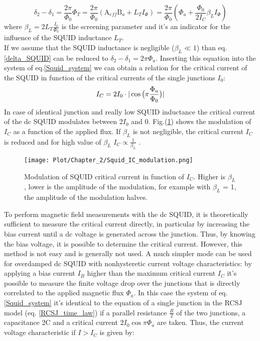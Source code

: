 \documentclass[12pt,a4paper]{report}
\begin{document}
    \begin{equation}
    	\delta_2-\delta_1= \frac{2\pi}{\Phi_0}\Phi_T=\frac{2\pi}{\Phi_0}(\text{A}_{eff}\text{B}_a + L_T I_{\Phi}) = \frac{2\pi}{\Phi_0} ( \Phi_a + \frac{\Phi_0}{2 I_C}\beta_LI_{\Phi})
    	\label{delta_SQUID}
    \end{equation}
    where $\beta_L = 2 L_T\frac{I_0}{\Phi_0}$ is the screening parameter and it's an indicator for the influence of the SQUID inductance $L_T$. \\
    If we assume that the SQUID inductance is negligible ($\beta_L \ll 1 $) than eq.\ref{delta_SQUID} can be reduced to $\delta_2 - \delta_1 = 2\pi\Phi_a$. Inserting this equation into the system of eq.\ref{Squid_system} we can obtain a relation for the critical current of the SQUID in function of the critical currents of the single junctions $I_0$:
    \begin{equation}
    	I_C=2I_0\cdot \arrowvert \cos \big( \pi \frac{\Phi_a}{\Phi_0}\big) \arrowvert
    	\label{CH2_eq_critical_current}
    \end{equation}
    In case of identical junction and really low SQUID inductance the critical current of the dc SQUID modulates between 2$I_0$ and 0. Fig.(\ref{SQUID_modulation}) shows the modulation of $I_C$ as a function of the applied flux. If $\beta_L$ is not negligible, the critical current $I_C$ is reduced and for high value of $\beta_L$ $I_C\propto \frac{1}{\beta_L}$ \cite{Squid_handbook_1}.
    \begin{figure} [H]
    	\centering
    	\texttt{[image: Plot/Chapter\_2/Squid\_IC\_modulation.png]}
    	\caption{\small{ Modulation of SQUID critical current in function of $I_C$. Higher is $\beta_L$, lower is the amplitude of the modulation, for example with $\beta_L$ = 1, the amplitude of the modulation halves.}}
    	\label{SQUID_modulation}
    \end{figure}
    To perform magnetic field measurements with the dc SQUID, it is theoretically sufficient to measure the critical current directly, in particular by increasing the bias current until a dc voltage is generated across the junction. Thus, by knowing the bias voltage, it is possible to determine the critical current. However, this method is not easy and is generally not used. A much simpler mode can be used for overdamped dc SQUID with nonhysteretic current voltage characteristics: by applying a bias current $I_B$ higher than the maximum critical current $I_C$ it's possible to measure the finite voltage drop over the junctions that is directly correlated to the applied magnetic flux $\Phi_a$. In this case the system of eq.\ref{Squid_system} it's identical to the equation of a single junction in the RCSJ model (eq. \ref{RCSJ_time_law}) if a parallel resistance $\frac{R}{2}$ of the two junctions, a capacitance 2C and a critical current $2I_0\cos\pi\Phi_a$ are taken. Thus, the current voltage characteristic if $I > I_C$ is given by:
\end{document}
